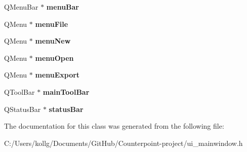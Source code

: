 \begin{DoxyCompactItemize}
\item 
\hypertarget{class_ui___main_window_a2be1c24ec9adfca18e1dcc951931457f}{}Q\+Menu\+Bar $\ast$ {\bfseries menu\+Bar}\label{class_ui___main_window_a2be1c24ec9adfca18e1dcc951931457f}

\item 
\hypertarget{class_ui___main_window_a7ba84cb4cdd6a12dc83bf4e100bd8d80}{}Q\+Menu $\ast$ {\bfseries menu\+File}\label{class_ui___main_window_a7ba84cb4cdd6a12dc83bf4e100bd8d80}

\item 
\hypertarget{class_ui___main_window_ace6c6ca40028a7bcb6ada6bb864e0941}{}Q\+Menu $\ast$ {\bfseries menu\+New}\label{class_ui___main_window_ace6c6ca40028a7bcb6ada6bb864e0941}

\item 
\hypertarget{class_ui___main_window_adcba5a32ce775ca26d6b10e5affbbff0}{}Q\+Menu $\ast$ {\bfseries menu\+Open}\label{class_ui___main_window_adcba5a32ce775ca26d6b10e5affbbff0}

\item 
\hypertarget{class_ui___main_window_abc8dfc324aee4732812b372fe6733a5f}{}Q\+Menu $\ast$ {\bfseries menu\+Export}\label{class_ui___main_window_abc8dfc324aee4732812b372fe6733a5f}

\item 
\hypertarget{class_ui___main_window_a5172877001c8c7b4e0f6de50421867d1}{}Q\+Tool\+Bar $\ast$ {\bfseries main\+Tool\+Bar}\label{class_ui___main_window_a5172877001c8c7b4e0f6de50421867d1}

\item 
\hypertarget{class_ui___main_window_a50fa481337604bcc8bf68de18ab16ecd}{}Q\+Status\+Bar $\ast$ {\bfseries status\+Bar}\label{class_ui___main_window_a50fa481337604bcc8bf68de18ab16ecd}

\end{DoxyCompactItemize}


The documentation for this class was generated from the following file\+:\begin{DoxyCompactItemize}
\item 
C\+:/\+Users/kollg/\+Documents/\+Git\+Hub/\+Counterpoint-\/project/ui\+\_\+mainwindow.\+h\end{DoxyCompactItemize}
